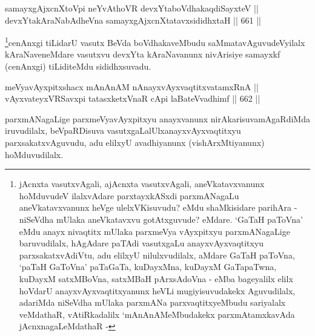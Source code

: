 
\begin{shl}
samayxgAjxcnXtoV\s pi neYvAthoVR devxYtaboVdhakaqdiSayxteV || \\
devxYtakAraNabAdheVna samayxgAjxcnXtatavxsididhxtaH \hfill || 661 ||  
\end{shl}

\begin{artha}
\footnote{jAcnxta vasutxvAgali, ajAcnxta vasutxvAgali,
aneVkatavxvanunx hoMduvudeV ilalxvAdare parxtayxkASxdi parxmANagaLu
aneVkatavxvanunx heVge ulelxVKisuvudu? eMdu shaMkisidare parihAra
- niSeVdha mUlaka aneVkatavxvu gotAtxguvude? eMdare. `GaTaH
paToVna' eMdu anayx nivaqtitx mUlaka parxmeVya vAyxpitxyu
parxmANagaLige baruvudilalx, hAgAdare paTAdi vasutxgaLu
anayxvAyxvaqtitxyu parxsakatxvAdiVtu, adu elilxyU nilulxvudilalx,
aMdare GaTaH paToVna, `paTaH GaToVna' paTaGaTa, kuDayxMna, kuDayxM
GaTapaTwna, kuDayxM satxMBoVna, satxMBaH pArxsAdoVna - eMba
bageyalilx elilx hoVdarU anayxvAyxvaqtitxyanunx heVLi
mugiyisuvudakekx Aguvudilalx, adariMda niSeVdha mUlaka parxmANa
parxvaqtitxyeMbudu sariyalalx veMdathaR, vAtiRkadalilx
`mAnAnAMeMbudakekx parxmAtamxkavAda jAcnxnagaLeMdathaR -}cenAnxgi tiLidarU vasutx BeVda boVdhakaveMbudu saMmatavAguvudeVyilalx kAraNaveneMdare vasutxvu devxYta kAraNavanunx nivArisiye samayxkf (cenAnxgi) tiLiditeMdu sididhxsuvadu.
\end{artha}

\begin{shl}
meVyavAyxpitxshacx mAnAnAM nAnayxvAyxvaqtitxvatamxRnA || \\
vAyxvateyxVRSavxpi tatasxketxVnaR cApi laBateV\s vadhimf  \hfill || 662 ||  
\end{shl}

\begin{artha}
parxmANagaLige parxmeVyavAyxpitxyu anayxvanunx nirAkarisuva\break mAgaRdiMda iruvudilalx, beVpaRDisuva vasutxgaLalUlx\break anayxvAyxvaqtitxyu parxsakatxvAguvudu, adu elilxyU avadhiyanunx (vishArxMtiyanunx) hoMduvudilalx.
\end{artha}





